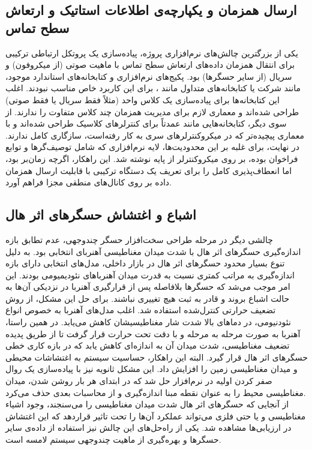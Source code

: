 \subsection{ارسال همزمان و یکپارچه‌ی اطلاعات استاتیک و ارتعاش سطح تماس}
یکی از بزرگترین چالش‌های نرم‌افزاری پروژه، پیاده‌سازی یک پروتکل ارتباطی  ترکیبی برای انتقال همزمان داده‌های ارتعاش سطح تماس با ماهیت صوتی (از میکروفون) و سریال (از سایر حسگرها) بود. پکیج‌های نرم‌افزاری و کتابخانه‌های استاندارد موجود، مانند  شرکت  یا کتابخانه‌های متداول مانند ، برای این کاربرد خاص مناسب نبودند. اغلب این کتابخانه‌ها برای پیاده‌سازی یک کلاس  واحد (مثلاً فقط سریال یا فقط صوتی) طراحی شده‌اند و معماری لازم برای مدیریت همزمان چند کلاس متفاوت را ندارند. از سوی دیگر، کتابخانه‌هایی مانند  عمدتاً برای کنترلرهای  کلاسیک طراحی شده‌اند و با معماری پیچیده‌تر
 که در میکروکنترلرهای سری  به کار رفته‌است، سازگاری کامل ندارند. در نهایت، برای غلبه بر این محدودیت‌ها، لایه نرم‌افزاری که شامل توصیف‌گرها
 و توابع فراخوان
 بوده، بر روی میکروکنترلر از پایه نوشته شد. این راهکار، اگرچه زمان‌بر بود، اما انعطاف‌پذیری کامل را برای تعریف یک دستگاه ترکیبی با قابلیت ارسال همزمان داده بر روی کانال‌های منطقی مجزا فراهم آورد.

\subsection{اشباع و اغتشاش حسگرهای اثر هال}
چالشی دیگر در مرحله طراحی سخت‌افزار حسگر چندوجهی، عدم تطابق بازه اندازه‌گیری حسگرهای اثر هال با شدت میدان مغناطیسی آهنربای انتخابی بود. به دلیل تنوع بسیار محدود حسگرهای اثر هال در بازار داخلی، مدل‌های انتخابی دارای بازه اندازه‌گیری به مراتب کمتری نسبت به قدرت میدان آهنربا‌های نئودیمیومی بودند. این امر موجب می‌شد که حسگرها بلافاصله پس از قرارگیری آهنربا در نزدیکی آن‌ها به حالت اشباع بروند و قادر به ثبت هیچ تغییری نباشند. برای حل این مشکل، از روش تضعیف حرارتی کنترل‌شده استفاده شد. اغلب مدل‌های آهنربا به خصوص انواع نئودنیومی، در دما‌های بالا شدت شار مغناطیسیشان کاهش می‌یابد\cite{osman2016temperature}. در همین راستا، آهنربا به صورت مرحله به مرحله و با دقت تحت حرارت قرار گرفت تا از طریق پدیده تضعیف مغناطیسی، شدت میدان آن به اندازه‌ای کاهش یابد که در بازه کاری خطی حسگرهای اثر هال قرار گیرد. البته این راهکار، حساسیت سیستم به اغتشاشات محیطی و میدان مغناطیسی زمین را افزایش داد. این مشکل ثانویه نیز با پیاده‌سازی یک روال صفر کردن اولیه در نرم‌افزار حل شد که در ابتدای هر بار روشن شدن، میدان مغناطیسی محیط را به عنوان نقطه مبنا اندازه‌گیری و از محاسبات بعدی حذف می‌کرد.
\\
از آنجایی که حسگر‌های اثر هال شدت میدان مغناطیسی را می‌سنجند، وجود اشیاء مغناطیسی و یا حتی فلزی می‌تواند عملکرد ‌آن‌ها را تحت تاثیر قرار‌دهد که این اغتشاش در ارزیابی‌ها مشاهده شد. یکی از راه‌حل‌های این چالش نیز استفاده از داده‌ی سایر حسگرها و بهره‌گیری از ماهیت چندوجهی سیستم لامسه است.
